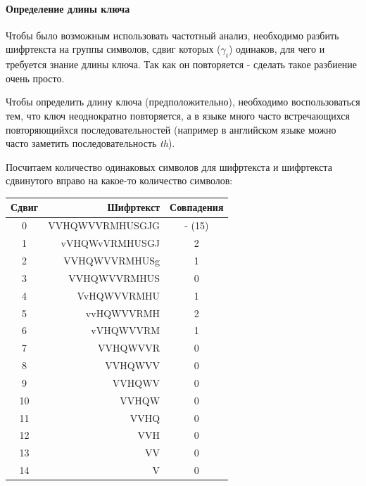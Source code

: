 \documentclass[a4paper]{article}
\begin{document}
  \paragraph{Определение длины ключа}

  Чтобы было возможным использовать частотный анализ, необходимо разбить шифртекста на
  группы символов, сдвиг которых ($\gamma_i$) одинаков, для чего и требуется знание длины ключа.
  Так как он повторяется - сделать такое разбиение очень просто.

  Чтобы определить длину ключа (предположительно), необходимо воспользоваться
  тем, что ключ неоднократно повторяется, а в языке много часто встречающихся повторяющийхся последовательностей
  (например в английском языке можно часто заметить последовательность \textit{th}).

  Посчитаем количество одинаковых символов для шифртекста и шифртекста сдвинутого вправо на
  какое-то количество символов:
  \begin{table}[H]
    \centering
    \begin{tabular}{| c | r | c |}
      \hline
      Сдвиг & Шифртекст & Совпадения \\
      \hline
      0 & VVHQWVVRMHUSGJG  & - (15) \\
      \hline
      1 &  vVHQWvVRMHUSGJ  & 2 \\ 
      \hline
      2 &   VVHQWVVRMHUSg  & 1 \\ 
      \hline
      3 &    VVHQWVVRMHUS  & 0 \\ 
      \hline
      4 &     VvHQWVVRMHU  & 1 \\ 
      \hline
      5 &      vvHQWVVRMH  & 2 \\ 
      \hline
      6 &       vVHQWVVRM  & 1 \\ 
      \hline
      7 &        VVHQWVVR  & 0 \\ 
      \hline
      8 &         VVHQWVV  & 0 \\ 
      \hline
      9 &          VVHQWV  & 0 \\ 
      \hline
      10 &           VVHQW & 0 \\ 
      \hline
      11 &            VVHQ & 0 \\ 
      \hline
      12 &             VVH & 0 \\ 
      \hline
      13 &              VV & 0 \\ 
      \hline
      14 &               V & 0 \\ 
      \hline
    \end{tabular}
  \end{table}
\end{document}
